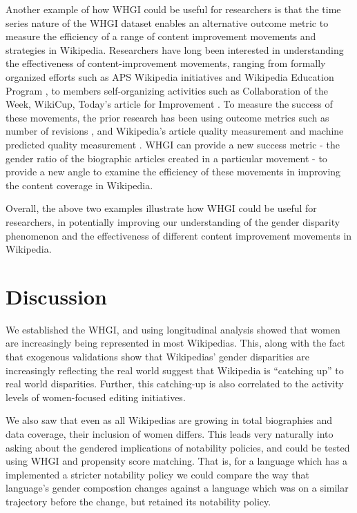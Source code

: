 \documentclass{sig-alternate-05-2015}
\begin{document}
Another example of how WHGI could be useful for researchers is that the time series nature of the WHGI dataset enables an alternative outcome metric to measure the efficiency of a range of content improvement movements and strategies in Wikipedia. Researchers have long been interested in understanding the effectiveness of content-improvement movements, ranging from formally organized efforts such as APS Wikipedia initiatives \cite{farzan_wikipedia_2013} and Wikipedia Education Program \cite{warncke-wang_success_2015}, to members self-organizing activities such as Collaboration of the Week, WikiCup, Today's article for Improvement \cite{zhu_organizing_2012}\cite{warncke-wang_success_2015}. To measure the success of these movements, the prior research has been using outcome metrics such as number of revisions \cite{zhu_organizing_2012}\cite{farzan_wikipedia_2013}, and Wikipedia's article quality measurement and machine predicted quality measurement \cite{warncke-wang_success_2015}. WHGI can provide a new success metric - the gender ratio of the biographic articles created in a particular movement - to provide a new angle to examine the efficiency of these movements in improving the content coverage in Wikipedia.

Overall, the above two examples illustrate how WHGI could be useful for researchers, in potentially improving our understanding of the gender disparity phenomenon and the effectiveness of different content improvement movements in Wikipedia.

   
\section{Discussion}
We established the WHGI, and using longitudinal analysis showed that women are increasingly being represented in most Wikipedias. This, along with the fact that exogenous validations show that Wiki\-pedias' gender disparities are increasingly reflecting the real world suggest that Wikipedia is ``catching up'' to real world disparities. Further, this catching-up is also correlated to the activity levels of women-focused editing initiatives.

We also saw that even as all Wikipedias are growing in total biographies and data coverage, their inclusion of women differs. This leads very naturally into asking about the gendered implications of notability policies, and could be tested using WHGI and propensity score matching. That is, for a language which has a implemented a stricter notability policy we could compare the way that language's gender compostion changes against a language which was on a similar trajectory before the change, but retained its notability policy.
\end{document}
